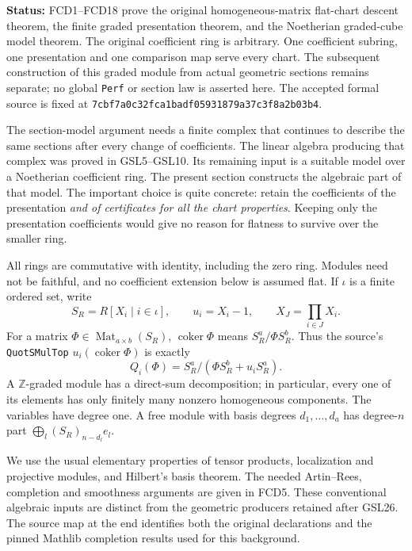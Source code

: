 \documentclass[11pt,a4paper]{article}
\numberwithin{equation}{section}
\theoremstyle{remark}\newtheorem{remark}[theorem]{Remark}
\newcommand{\status}[1]{\textbf{Status:} #1}
\begin{document}
\status{FCD1--FCD18 prove the original homogeneous-matrix flat-chart
descent theorem, the finite graded presentation theorem, and the
Noetherian graded-cube model theorem.  The original coefficient ring is
arbitrary.  One coefficient subring, one presentation and one comparison
map serve every chart.  The subsequent construction of this graded
module from actual geometric sections remains separate; no global
\texttt{Perf} or section law is asserted here.  The accepted formal
source is fixed at
\texttt{7cbf7a0c32fca1badf05931879a37c3f8a2b03b4}.}

The section-model argument needs a finite complex that continues to
describe the same sections after every change of coefficients.  The
linear algebra producing that complex was proved in GSL5--GSL10.  Its
remaining input is a suitable model over a Noetherian coefficient ring.
The present section constructs the algebraic part of that model.
The important choice is quite concrete: retain the coefficients of the
presentation \emph{and of certificates for all the chart properties}.
Keeping only the presentation coefficients would give no reason for
flatness to survive over the smaller ring.

All rings are commutative with identity, including the zero ring.
Modules need not be faithful, and no coefficient extension below is
assumed flat.  If $\iota$ is a finite ordered set, write
\[
 S_R=R[X_i\mid i\in\iota],\qquad
 u_i=X_i-1,\qquad X_J=\prod_{i\in J}X_i.
\]
For a matrix $\Phi\in\operatorname{Mat}_{a\times b}(S_R)$,
$\operatorname{coker}\Phi$ means
$S_R^a/\Phi S_R^b$.  Thus the source's
\texttt{Quot\allowbreak SMul\allowbreak Top} $u_i(\operatorname{coker}\Phi)$ is exactly
\[
 Q_i(\Phi)=S_R^a/(\Phi S_R^b+u_iS_R^a).                 \tag{FCD.1}\label{FCD.1}
\]
A $\mathbb Z$-graded module has a direct-sum decomposition; in
particular, every one of its elements has only finitely many nonzero
homogeneous components.  The variables have degree one.  A free
module with basis degrees $d_1,\ldots,d_a$ has degree-$n$ part
$\bigoplus_l(S_R)_{n-d_l}e_l$.

We use the usual elementary properties of tensor products, localization
and projective modules, and Hilbert's basis theorem.  The needed
Artin--Rees, completion and smoothness arguments are given in FCD5.
These conventional algebraic inputs are distinct from
the geometric producers retained after GSL26.  The source map at the
end identifies both the original declarations and the pinned Mathlib
completion results used for this background.
\end{document}
